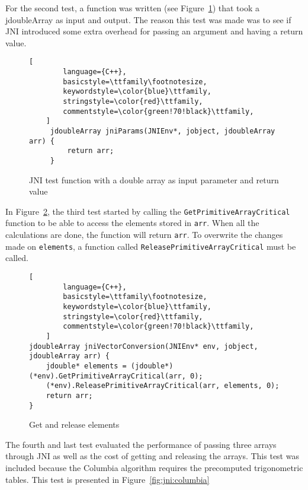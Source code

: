 For the second test, a function was written (see Figure~\ref{fig:jni:params}) that took a jdoubleArray as input and output. The reason this test was made was to see if JNI introduced some extra overhead for passing an argument and having a return value.

\begin{figure}[H]
\begin{lstlisting}[
        language={C++},
        basicstyle=\ttfamily\footnotesize,
        keywordstyle=\color{blue}\ttfamily,
        stringstyle=\color{red}\ttfamily,
        commentstyle=\color{green!70!black}\ttfamily,
    ]
     jdoubleArray jniParams(JNIEnv*, jobject, jdoubleArray arr) {
         return arr;
     }
\end{lstlisting}
\caption{JNI test function with a double array as input parameter and return value}
\label{fig:jni:params}
\end{figure}

In Figure~\ref{fig:jni:conversion}, the third test started by calling the \texttt{GetPrimitiveArrayCritical} function to be able to access the elements stored in \texttt{arr}. When all the calculations are done, the function will return \texttt{arr}. To overwrite the changes made on \texttt{elements}, a function called \texttt{ReleasePrimitiveArrayCritical} must be called.

\begin{figure}
\begin{lstlisting}[
        language={C++},
        basicstyle=\ttfamily\footnotesize,
        keywordstyle=\color{blue}\ttfamily,
        stringstyle=\color{red}\ttfamily,
        commentstyle=\color{green!70!black}\ttfamily,
    ]
jdoubleArray jniVectorConversion(JNIEnv* env, jobject, jdoubleArray arr) {
    jdouble* elements = (jdouble*)(*env).GetPrimitiveArrayCritical(arr, 0);
    (*env).ReleasePrimitiveArrayCritical(arr, elements, 0);
    return arr;
}
\end{lstlisting}
\caption{Get and release elements}
\label{fig:jni:conversion}
\end{figure}

The fourth and last test evaluated the performance of passing three arrays through JNI as well as the cost of getting and releasing the arrays. This test was included because the Columbia algorithm requires the precomputed trigonometric tables. This test is presented in Figure~\ref{fig:jni:columbia}

